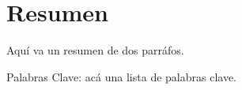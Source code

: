 \chapter{Resumen}
\label{chap:resumen}

Aquí va un resumen de dos parráfos. 

\vspace{1em}
\noindent
Palabras Clave: acá una lista de palabras clave.

\clearemptydoublepage
